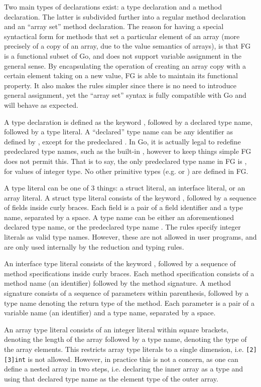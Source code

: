 Two main types of declarations exist: a type declaration and a method
declaration. The latter is subdivided further into a regular method declaration
and an ``array set'' method declaration. The reason for having a special
syntactical form for methods that set a particular element of an array (more
precisely of a copy of an array, due to the value semantics of arrays), is that
FG is a functional subset of Go, and does not support variable assignment in the
general sense. By encapsulating the operation of creating an array copy with a
certain element taking on a new value, FG is able to maintain its functional
property. It also makes the rules simpler since there is no need to introduce
general assignment, yet the ``array set'' syntax is fully compatible with Go and
will behave as expected.

A type declaration is defined as the keyword \type, followed by a declared type
name, followed by a type literal. A ``declared'' type name can be any identifier
as defined by \autocite{spec}, except for the predeclared . In Go, it is
actually legal to redefine predeclared type names, such as the built-in
, however to keep things simple FG does not permit this. That is to say,
the only predeclared type name in FG is , for values of integer type.
No other primitive types (e.g.  or ) are defined in FG.

A type literal can be one of 3 things: a struct literal, an interface literal,
or an array literal. A struct type literal consists of the keyword \struct,
followed by a sequence of fields inside curly braces. Each field is a pair of a
field identifier and a type name, separated by a space. A type name can be
either an aforementioned declared type name, or the predeclared type name
. The rules specify integer literals as valid type names. However, these
are not allowed in user programs, and are only used internally by the reduction
and typing rules.

An interface type literal consists of the keyword \interface, followed by a
sequence of method specifications inside curly braces. Each method specification
consists of a method name (an identifier) followed by the method signature. A
method signature consists of a sequence of parameters within parenthesis,
followed by a type name denoting the return type of the method. Each parameter
is a pair of a variable name (an identifier) and a type name, separated by a
space.

An array type literal consists of an integer literal within square brackets,
denoting the length of the array followed by a type name, denoting the type of
the array elements. This restricts array type literals to a single dimension,
i.e. \texttt{[2][3]int} is not allowed. However, in practice this is not a
concern, as one can define a nested array in two steps, i.e. declaring the inner
array as a type and using that declared type name as the element type of the
outer array.


